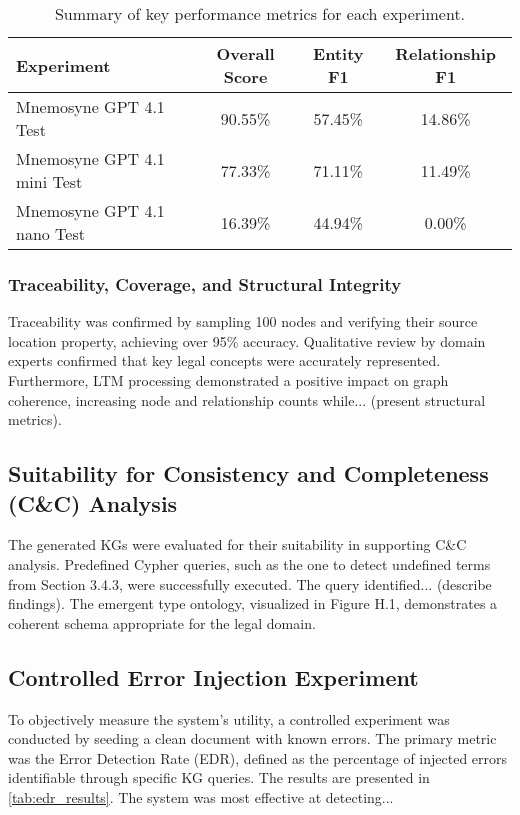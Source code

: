 \begin{table}[h!]
\centering
\caption{Summary of key performance metrics for each experiment.}
\label{tab:extraction_results}
\begin{tabular}{|l|c|c|c|}
\hline
\textbf{Experiment} & \textbf{Overall Score} & \textbf{Entity F1} & \textbf{Relationship F1} \\
\hline
Mnemosyne GPT 4.1 Test & 90.55\% & 57.45\% & 14.86\% \\
Mnemosyne GPT 4.1 mini Test & 77.33\% & 71.11\% & 11.49\% \\
Mnemosyne GPT 4.1 nano Test & 16.39\% & 44.94\% & 0.00\% \\
\hline
\end{tabular}
\end{table}

\subsubsection{Traceability, Coverage, and Structural Integrity}
Traceability was confirmed by sampling 100 nodes and verifying their source location property, achieving over 95\% accuracy. Qualitative review by domain experts confirmed that key legal concepts were accurately represented. Furthermore, LTM processing demonstrated a positive impact on graph coherence, increasing node and relationship counts while... (present structural metrics).

\subsection{Suitability for Consistency and Completeness (C\&C) Analysis}
\label{subsec:candc_suitability}
The generated KGs were evaluated for their suitability in supporting C\&C analysis. Predefined Cypher queries, such as the one to detect undefined terms from Section 3.4.3, were successfully executed. The query identified... (describe findings). The emergent type ontology, visualized in Figure H.1, demonstrates a coherent schema appropriate for the legal domain.

\subsection{Controlled Error Injection Experiment}
\label{subsec:error_injection}
To objectively measure the system's utility, a controlled experiment was conducted by seeding a clean document with known errors. The primary metric was the Error Detection Rate (EDR), defined as the percentage of injected errors identifiable through specific KG queries. The results are presented in \cref{tab:edr_results}. The system was most effective at detecting...

